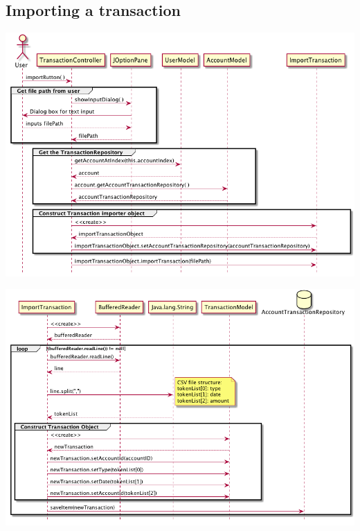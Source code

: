\documentclass[12pt]{article}
\begin{document}
\subsection{Importing a transaction}
\includegraphics[width=\textwidth,height=\textheight,keepaspectratio]{diagrams/sequence/importTransaction.png}

\includegraphics[width=\textwidth,height=\textheight,keepaspectratio]{diagrams/sequence/importTransaction2.png}
\end{document}
